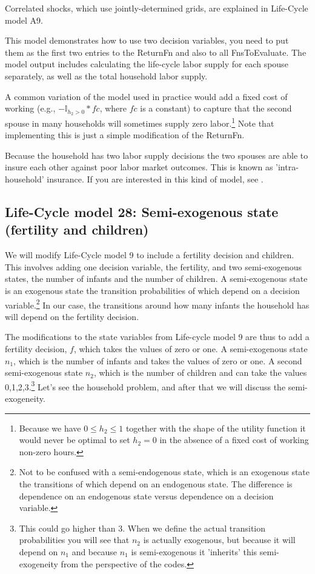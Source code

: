 Correlated shocks, which use jointly-determined grids, are explained in Life-Cycle model A9.

This model demonstrates how to use two decision variables, you need to put them as the first two entries to the ReturnFn and also to all FnsToEvaluate. The model output includes calculating the life-cycle labor supply for each spouse separately, as well as the total household labor supply.

A common variation of the model used in practice would add a fixed cost of working (e.g., $-\mathbb{I}_{h_2>0}*fc$, where $fc$ is a constant) to capture that the second spouse in many households will sometimes supply zero labor.\footnote{Because we have $0\leq h_2 \leq 1$ together with the shape of the utility function it would never be optimal to set $h_2=0$ in the absence of a fixed cost of working non-zero hours.} Note that implementing this is just a simple modification of the ReturnFn.

Because the household has two labor supply decisions the two spouses are able to insure each other against poor labor market outcomes. This is known as 'intra-household' insurance. If you are interested in this kind of model, see \cite*{OrtigueiraSiassi2013}.


\subsection{Life-Cycle model 28: Semi-exogenous state (fertility and children)}
We will modify Life-Cycle model 9 to include a fertility decision and children. This involves adding one decision variable, the fertility, and two semi-exogenous states, the number of infants and the number of children. A semi-exogenous state is an exogenous state the transition probabilities of which depend on a decision variable.\footnote{Not to be confused with a semi-endogenous state, which is an exogenous state the transitions of which depend on an endogenous state. The difference is dependence on an endogenous state versus dependence on a decision variable.} In our case, the transitions around how many infants the household has will depend on the fertility decision.

The modifications to the state variables from Life-cycle model 9 are thus to add a fertility decision, $f$, which takes the values of zero or one. A semi-exogenous state $n_1$, which is the number of infants and takes the values of zero or one. A second semi-exogenous state $n_2$, which is the number of children and can take the values 0,1,2,3.\footnote{This could go higher than 3. When we define the actual transition probabilities you will see that $n_2$ is actually exogenous, but because it will depend on $n_1$ and because $n_1$ is semi-exogenous it 'inherits' this semi-exogeneity from the perspective of the codes.} Let's see the household problem, and after that we will discuss the semi-exogeneity.

